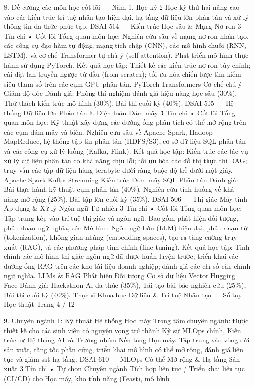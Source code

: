 8. Đề cương các môn học cốt lõi — Năm 1, Học kỳ 2
Học kỳ thứ hai nâng cao vào các kiến trúc trí tuệ nhân tạo hiện đại, hạ tầng dữ liệu lớn phân tán và xử lý thông tin đa thức phức tạp.
DSAI-504 — Kiến trúc Học sâu \& Mạng Nơ-ron
3 Tín chỉ • Cốt lõi
Tổng quan môn học: Nghiên cứu sâu về mạng nơ-ron nhân tạo, các công cụ đạo hàm tự động, mạng tích chập (CNN), các mô hình chuỗi (RNN, LSTM), và cơ chế Transformer tự chú ý (self-attention). Phát triển mô hình thực hành sử dụng PyTorch.
Kết quả học tập: Thiết kế các kiến trúc nơ-ron tùy chỉnh; cài đặt lan truyền ngược từ đầu (from scratch); tối ưu hóa chiến lược tìm kiếm siêu tham số trên các cụm GPU phân tán.
PyTorch Transformers Cơ chế chú ý Giảm độ dốc
Đánh giá: Phòng thí nghiệm đánh giá hiệu năng học sâu (30\%), Thử thách kiến trúc mô hình (30\%), Bài thi cuối kỳ (40\%).
DSAI-505 — Hệ thống Dữ liệu lớn Phân tán \& Điện toán Đám mây
3 Tín chỉ • Cốt lõi
Tổng quan môn học: Kỹ thuật xây dựng các đường ống phân tích có thể mở rộng trên các cụm đám mây và biên. Nghiên cứu sâu về Apache Spark, Hadoop MapReduce, hệ thống tập tin phân tán (HDFS/S3), cơ sở dữ liệu SQL phân tán và các công cụ xử lý luồng (Kafka, Flink).
Kết quả học tập: Kiến trúc các tác vụ xử lý dữ liệu phân tán có khả năng chịu lỗi; tối ưu hóa các đồ thị thực thi DAG; truy vấn các tập dữ liệu hàng terabyte dưới ràng buộc độ trễ dưới một giây.
Apache Spark Kafka Streaming Kiến trúc Đám mây SQL Phân tán
Đánh giá: Bài thực hành kỹ thuật cụm phân tán (40\%), Nghiên cứu tình huống về khả năng mở rộng (25\%), Bài tập lớn cuối kỳ (35\%).
DSAI-506 — Thị giác Máy tính Áp dụng \& Xử lý Ngôn ngữ Tự nhiên
3 Tín chỉ • Cốt lõi
Tổng quan môn học: Tập trung kép vào trí tuệ thị giác và ngôn ngữ. Bao gồm phát hiện đối tượng, phân đoạn ngữ nghĩa, các Mô hình Ngôn ngữ Lớn (LLM) hiện đại, phân đoạn từ (tokenization), không gian nhúng (embedding spaces), tạo ra tăng cường truy xuất (RAG), và các phương pháp tinh chỉnh (fine-tuning).
Kết quả học tập: Tinh chỉnh các mô hình thị giác-ngôn ngữ đã được huấn luyện trước; triển khai các đường ống RAG trên các kho tài liệu doanh nghiệp; đánh giá các chỉ số căn chỉnh ngữ nghĩa.
LLMs \& RAG Phát hiện Đối tượng Cơ sở dữ liệu Vector Hugging Face
Đánh giá: Hackathon AI đa thức (35\%), Tái tạo bài báo nghiên cứu (25\%), Bài thi cuối kỳ (40\%).
Thạc sĩ Khoa học Dữ liệu \& Trí tuệ Nhân tạo — Sổ tay Học thuật
Trang 4 / 12

9. Chuyên ngành 1: Kỹ thuật Hệ thống Học máy
Trọng tâm chuyên ngành: Được thiết kế cho các sinh viên có nguyện vọng trở thành Kỹ sư MLOps chính, Kiến trúc sư Hệ thống AI và Trưởng nhóm Nền tảng Học máy. Tập trung vào vòng đời sản xuất, tăng tốc phần cứng, triển khai mô hình có thể mở rộng, đánh giá liên tục và giám sát hạ tầng.
DSAI-610 — MLOps Có thể Mở rộng \& Hạ tầng Sản xuất
3 Tín chỉ • Tự chọn Chuyên ngành
Tích hợp liên tục / Triển khai liên tục (CI/CD) cho Học máy, kho tính năng (Feast), mô hình

